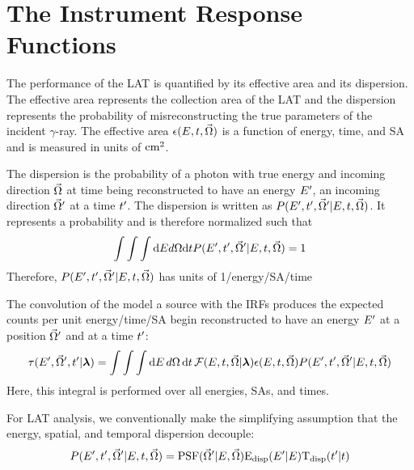 \section{The  Instrument Response Functions}

The performance of the \ac{LAT} is quantified by its effective area and
its dispersion. The effective area represents the collection area of the
\ac{LAT} and the dispersion represents the probability of misreconstructing
the true parameters of the incident $\gamma$-ray.
The effective area $\epsilon(E,t,\vec\Omega)$ is a
function of energy, time, and \ac{SA} and is measured in units of $\text{cm}^2$.

The dispersion is the probability of a photon with true energy
\energy and incoming direction $\vec\Omega$ at time \time being
reconstructed to have an energy $E'$, an incoming direction
$\vec\Omega'$ at a time $t'$.  The dispersion is written as
$P(E',t',\vec\Omega'|E,t,\vec\Omega)$.
It represents a probability and is therefore normalized such that
\begin{equation}
  \int \int \int \text{d}E d\Omega \text{d}t 
  P(E',t',\vec\Omega'|E,t,\vec\Omega) = 1
\end{equation}
Therefore,
$P(E',t',\vec\Omega'|E,t,\vec\Omega)$
has units of 1/energy/\acs{SA}/time

The convolution of the model a source with the \acp{IRF} produces the
expected counts per unit energy/time/\acs{SA} begin reconstructed to have
an energy $E'$ at a position $\vec\Omega'$ and at a time $t'$:
\begin{equation}
  \eqnlabel{eventrate}
  \eventrate(\energy',\solidangle',\time'|\modelparams)
  = \int \int \int \denergy \, \dsolidangle \, \dtime \,
  \fluxdensity(\energy,\time,\vec\Omega|\modelparams) 
  \effectivearea(\energy,\time,\solidangle) \dispersion(\energy',\time',\solidangle'|\energy,\time,\solidangle)
\end{equation}
Here, this integral is performed over all energies, \acp{SA}, and times.

For \ac{LAT} analysis, we conventionally make the simplifying assumption that
the energy, spatial, and temporal dispersion decouple:
\begin{equation}
  P(E',t',\vec\Omega'|E,t,\vec\Omega) = 
  \text{PSF}(\vec\Omega'|E,\vec\Omega) \text{E}_\text{disp}(E'|E) \text{T}_\text{disp}(t'|t)
\end{equation}

